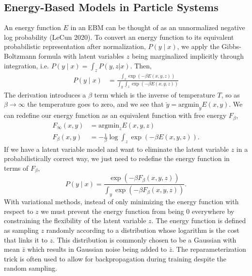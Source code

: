 \documentclass{article}
\begin{document}
    \subsection{Energy-Based Models in Particle Systems}
     An energy function $E$ in an EBM can be thought of as an unnormalized negative log probability (LeCun 2020). 
    To convert an energy function to its equivalent probabilistic representation after normalization,
    $P(y \mid x)$, we apply the Gibbs-Boltzmann formula with latent variables $z$ being marginalized implicitly through integration, i.e. $P(y \mid x) = \int_z P(y,z | x)$. Then,
    \begin{align*}
        P(y \mid x) &= \frac{ \int_z \exp(-\beta E(x,y,z)) }{ \int_y \int_z \exp(-\beta E(x, y, z))} 
    \end{align*}
    The derivation introduces a $\beta$ term which is the inverse of temperature $T$, so as $\beta \rightarrow \infty$ the temperature goes to zero, and we see that $\check{y} = \text{argmin}_{y} E(x,y)$. We can redefine our energy function as an equivalent function with free energy $F_\beta$,
    \begin{align*}
        F_{\infty} (x,y) &= \text{argmin}_z E(x,y,z)\\
        F_{\beta} (x,y) &= -\frac{1}{\beta} \log \int_z \exp(-\beta E(x,y,z)).
    \end{align*}
    If we have a latent variable model and want to eliminate the latent variable $z$ in a probabilistically correct way, we just need to redefine the energy function in terms of $F_\beta$,
    \begin{equation}
         P(y \mid x) = \frac{ \exp(-\beta F_\beta(x,y,z)) }{ \int_y \exp(-\beta F_\beta(x, y, z))}.
    \end{equation}
    With variational methods, instead of only minimizing the energy function with respect to $z$ we must prevent the energy function from being 0 everywhere by constraining the flexibility of the latent variable $z$. The energy function is defined as sampling $z$ randomly according to a distribution whose logarithm is the cost that links it to $z$. This distribution is commonly chosen to be a Gaussian with mean $\bar z$ which results in Gaussian noise being added to $\bar z$. The reparameterization trick is often used to allow for backpropagation during training despite the random sampling.
    
\end{document}
